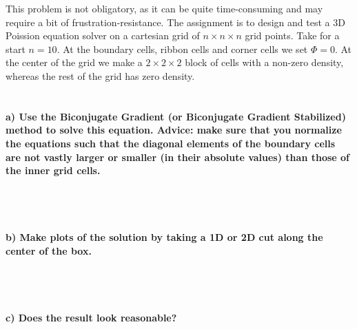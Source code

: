 This problem is not obligatory, as it can be quite time-consuming and 
may require a bit of frustration-resistance. The assignment is to 
design and test a 3D Poission equation solver on a cartesian grid of 
$n\times n\times n$ grid points. Take for a start $n=10$. At the 
boundary cells, ribbon cells and corner cells we set $\Phi=0$. At the 
center of the grid we make a $2\times 2\times 2$ block of cells with a 
non-zero density, whereas the rest of the grid has zero density. \\ 
\\
\paragraph{
    a) Use the Biconjugate Gradient (or Biconjugate Gradient Stabilized) 
    method to solve this equation. Advice: make sure that you normalize 
    the equations such that the diagonal elements of the boundary cells 
    are not vastly larger or smaller (in their absolute values) than 
    those of the inner grid cells.
} \ \\
    \\


\paragraph{
    b) Make plots of the solution by taking a 1D or 2D cut along the 
    center of the box.
} \ \\
    \\

\paragraph{
    c) Does the result look reasonable?
} \ \\
    \\

